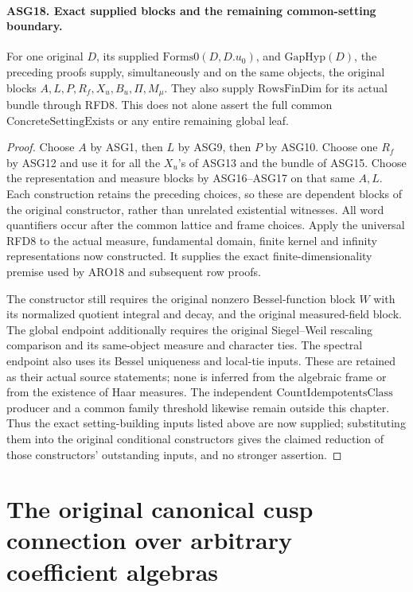 \documentclass[11pt,a4paper]{article}
\numberwithin{equation}{section}
\theoremstyle{remark}\newtheorem{remark}[theorem]{Remark}
\begin{document}
\paragraph{ASG18. Exact supplied blocks and the remaining common-setting boundary.}
\label{claim:ASG18}
For one original \(D\), its supplied \(\mathrm{Forms0}(D,D.u_0)\),
and \(\mathrm{GapHyp}(D)\), the preceding proofs supply,
simultaneously and on the same objects, the original blocks
\(A,L,P,R_f,X_u,B_u,\Pi,M_\mu\).
They also supply \(\mathrm{RowsFinDim}\) for its actual bundle
through RFD8.  This does not alone assert the full common
\(\mathrm{ConcreteSettingExists}\) or any entire remaining global leaf.
\begin{proof}
Choose \(A\) by ASG1, then \(L\) by ASG9, then \(P\)
by ASG10.  Choose one \(R_f\) by ASG12 and use it for all the
\(X_u\)'s of ASG13 and the bundle of ASG15.  Choose the
representation and measure blocks by ASG16--ASG17 on that same
\(A,L\).  Each construction retains the preceding choices, so
these are dependent blocks of the original constructor, rather than
unrelated existential witnesses.  All word quantifiers occur after
the common lattice and frame choices.  Apply the universal RFD8 to
the actual measure, fundamental domain, finite kernel and infinity
representations now constructed.  It supplies the exact
finite-dimensionality premise used by ARO18 and subsequent row proofs.

The constructor still requires the original nonzero Bessel-function
block \(W\) with its normalized quotient integral and decay, and
the original measured-field block.  The global endpoint additionally
requires the original Siegel--Weil rescaling comparison and its
same-object measure and character ties.  The spectral endpoint also
uses its Bessel uniqueness and local-tie inputs.  These are retained
as their actual source statements; none is inferred from the algebraic
frame or from the existence of Haar measures.  The independent
\(\mathrm{CountIdempotentsClass}\) producer and a common family
threshold likewise remain outside this chapter.
Thus the exact setting-building inputs listed above are now supplied;
substituting them into the original conditional constructors gives the
claimed reduction of those constructors' outstanding inputs, and no
stronger assertion.
\end{proof}


\section{The original canonical cusp connection over arbitrary coefficient algebras}
\label{sec:cnc-v47}
\end{document}
